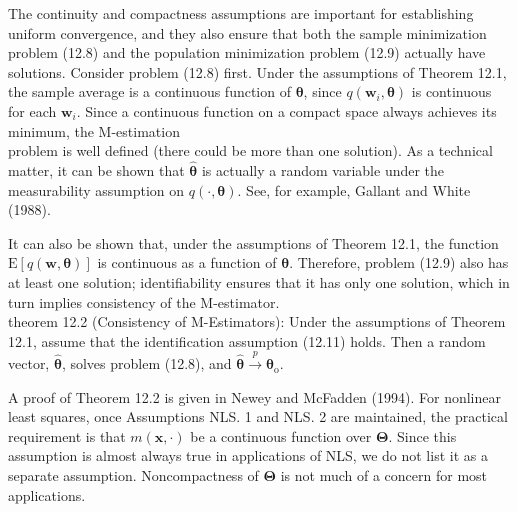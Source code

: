\documentclass[10pt]{article}
\begin{document}
The continuity and compactness assumptions are important for establishing uniform convergence, and they also ensure that both the sample minimization problem (12.8) and the population minimization problem (12.9) actually have solutions. Consider problem (12.8) first. Under the assumptions of Theorem 12.1, the sample average is a continuous function of $\boldsymbol{\theta}$, since $q\left(\mathbf{w}_{i}, \boldsymbol{\theta}\right)$ is continuous for each $\mathbf{w}_{i}$. Since a continuous function on a compact space always achieves its minimum, the M-estimation\\
problem is well defined (there could be more than one solution). As a technical matter, it can be shown that $\hat{\boldsymbol{\theta}}$ is actually a random variable under the measurability assumption on $q(\cdot, \boldsymbol{\theta})$. See, for example, Gallant and White (1988).

It can also be shown that, under the assumptions of Theorem 12.1, the function $\mathrm{E}[q(\mathbf{w}, \boldsymbol{\theta})]$ is continuous as a function of $\boldsymbol{\theta}$. Therefore, problem (12.9) also has at least one solution; identifiability ensures that it has only one solution, which in turn implies consistency of the M-estimator.\\
theorem 12.2 (Consistency of M-Estimators): Under the assumptions of Theorem 12.1, assume that the identification assumption (12.11) holds. Then a random vector, $\hat{\boldsymbol{\theta}}$, solves problem (12.8), and $\hat{\boldsymbol{\theta}} \xrightarrow{p} \boldsymbol{\theta}_{\mathrm{o}}$.

A proof of Theorem 12.2 is given in Newey and McFadden (1994). For nonlinear least squares, once Assumptions NLS. 1 and NLS. 2 are maintained, the practical requirement is that $m(\mathbf{x}, \cdot)$ be a continuous function over $\boldsymbol{\Theta}$. Since this assumption is almost always true in applications of NLS, we do not list it as a separate assumption. Noncompactness of $\boldsymbol{\Theta}$ is not much of a concern for most applications.
\end{document}
